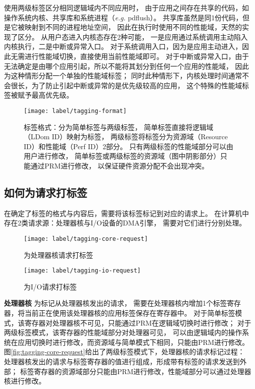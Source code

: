 使用两级标签区分相同逻辑域内不同应用时，
由于应用之间存在共享的代码，如操作系统内核、共享库和系统进程（\emph{e.g.} pdflush）。
共享库虽然是同1份代码，但是它被映射到不同的进程地址空间，
因此在执行时使用不同的性能域，天然的实现了区分。
从用户态进入内核态存在2种可能，
一是应用通过系统调用主动陷入内核执行，二是中断或异常入口。
对于系统调用入口，因为是应用主动进入，因此无需进行性能域切换，直接使用当前性能域即可。
对于中断或异常入口，由于无法确定是由哪个应用引起，所以不能将其划分到任何一个应用的性能域，
因此为这种情形分配一个单独的性能域标签；
同时此种情形下，内核处理时间通常不会很长，为了防止引起中断或异常的是优先级较高的应用，
这个特殊的性能域标签被赋予最高优先级。

\begin{figure}[htb]
  \centering
  \texttt{[image: label/tagging-format]}
  \caption[标签格式]{标签格式：分为简单标签与两级标签，
    简单标签直接将逻辑域（LDom ID）映射为标签，
    两级标签将标签分为资源域（Resource ID）和性能域（Perf ID）2部分。
    只有两级标签的性能域部分可以由用户进行修改，
    简单标签或两级标签的资源域（图中阴影部分）只能通过PRM进行修改，
    以保证硬件资源分配不会出现冲突。}
  \label{fig:tagging-format}
\end{figure}

\subsection{如何为请求打标签}
\label{chap:labeladdrspace:tagging}
在确定了标签的格式与内容后，需要将该标签标记到对应的请求上。
在计算机中存在2类请求源：处理器核与I/O设备的DMA引擎，
需要对它们进行分别处理。

\begin{figure}[tb]
\begin{minipage}[b]{0.48\textwidth}
  \centering
  \texttt{[image: label/tagging-core-request]}
  \caption{为处理器核请求打标签}
  \label{fig:tagging-core-request}
\end{minipage}\hfill
\begin{minipage}[b]{0.48\textwidth}
  \centering
  \texttt{[image: label/tagging-io-request]}
  \caption{为I/O请求打标签}
  \label{fig:tagging-io-request}
\end{minipage}
\end{figure}

\textbf{处理器核}\quad
为标记从处理器核发出的请求，
需要在处理器核内增加1个标签寄存器，将当前正在使用该处理器核的应用标签保存在寄存器中。
对于简单标签模式，该寄存器对处理器核不可见，只能通过PRM在逻辑域切换时进行修改；
对于两级标签模式，该寄存器的性能域部分对处理器可见，
可以由逻辑域内的操作系统在应用切换时进行修改，而资源域与简单模式下相同，只能由PRM进行修改。
图\ref{fig:tagging-core-request}给出了两级标签模式下，处理器核的请求标记过程：
处理器核发出的请求与标签寄存器的值进行组成，形成带有标签的请求发送到外部；
标签寄存器的资源域部分只能由PRM进行修改，性能域部分可以通过处理器核进行修改。

